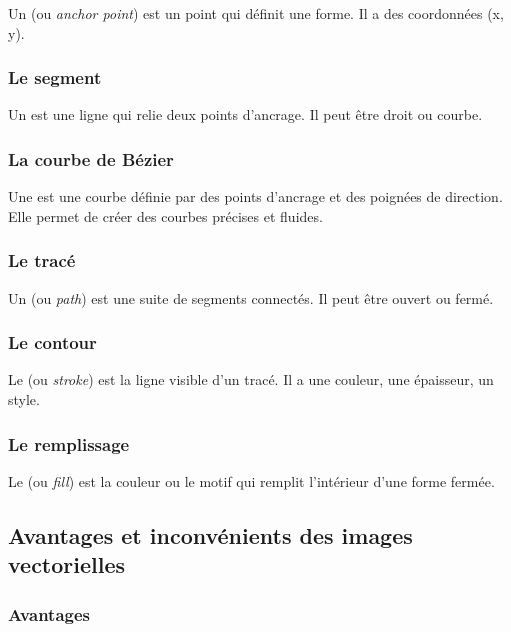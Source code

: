 Un  (ou \emph{anchor point}) est un point qui définit une forme. Il a des coordonnées (x, y).

\subsubsection{Le segment}

Un  est une ligne qui relie deux points d'ancrage. Il peut être droit ou courbe.

\subsubsection{La courbe de Bézier}

Une  est une courbe définie par des points d'ancrage et des poignées de direction. Elle permet de créer des courbes précises et fluides.

\subsubsection{Le tracé}

Un  (ou \emph{path}) est une suite de segments connectés. Il peut être ouvert ou fermé.

\subsubsection{Le contour}

Le  (ou \emph{stroke}) est la ligne visible d'un tracé. Il a une couleur, une épaisseur, un style.

\subsubsection{Le remplissage}

Le  (ou \emph{fill}) est la couleur ou le motif qui remplit l'intérieur d'une forme fermée.

\subsection{Avantages et inconvénients des images vectorielles}

\subsubsection{Avantages}

